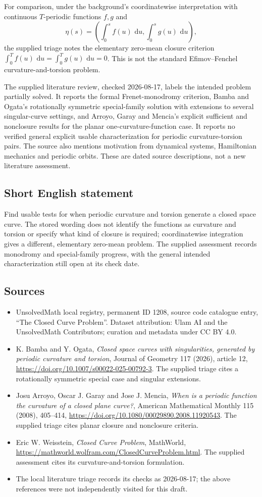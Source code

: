 \documentclass[11pt]{article}
\newcommand{\dd}{\,\mathrm{d}}
\begin{document}
For comparison, under the background's coordinatewise interpretation with continuous $T$-periodic functions $f,g$ and
\[
\eta(s)=\left(\int_0^s f(u)\,\dd u,\int_0^s g(u)\,\dd u\right),
\]
the supplied triage notes the elementary zero-mean closure criterion $\int_0^T f(u)\,\dd u=\int_0^T g(u)\,\dd u=0$. This is not the standard Efimov--Fenchel curvature-and-torsion problem.

The supplied literature review, checked 2026-08-17, labels the intended problem partially solved. It reports the formal Frenet-monodromy criterion, Bamba and Ogata's rotationally symmetric special-family solution with extensions to several singular-curve settings, and Arroyo, Garay and Mencia's explicit sufficient and nonclosure results for the planar one-curvature-function case. It reports no verified general explicit usable characterization for periodic curvature-torsion pairs. The source also mentions motivation from dynamical systems, Hamiltonian mechanics and periodic orbits. These are dated source descriptions, not a new literature assessment.
\subsection{Short English statement}
Find usable tests for when periodic curvature and torsion generate a closed space curve. The stored wording does not identify the functions as curvature and torsion or specify what kind of closure is required; coordinatewise integration gives a different, elementary zero-mean problem. The supplied assessment records monodromy and special-family progress, with the general intended characterization still open at its check date.
\subsection{Sources}
\begin{itemize}
\item UnsolvedMath local registry, permanent ID 1208, source code catalogue entry, ``The Closed Curve Problem''. Dataset attribution: Ulam AI and the UnsolvedMath Contributors; curation and metadata under CC BY 4.0.
\item K. Bamba and Y. Ogata, \emph{Closed space curves with singularities, generated by periodic curvature and torsion}, Journal of Geometry 117 (2026), article 12, \url{https://doi.org/10.1007/s00022-025-00792-3}. The supplied triage cites a rotationally symmetric special case and singular extensions.
\item Josu Arroyo, Oscar J. Garay and Jose J. Mencia, \emph{When is a periodic function the curvature of a closed plane curve?}, American Mathematical Monthly 115 (2008), 405--414, \url{https://doi.org/10.1080/00029890.2008.11920543}. The supplied triage cites planar closure and nonclosure criteria.
\item Eric W. Weisstein, \emph{Closed Curve Problem}, MathWorld, \url{https://mathworld.wolfram.com/ClosedCurveProblem.html}. The supplied assessment cites its curvature-and-torsion formulation.
\item The local literature triage records its checks as 2026-08-17; the above references were not independently visited for this draft.
\end{itemize}
\end{document}

